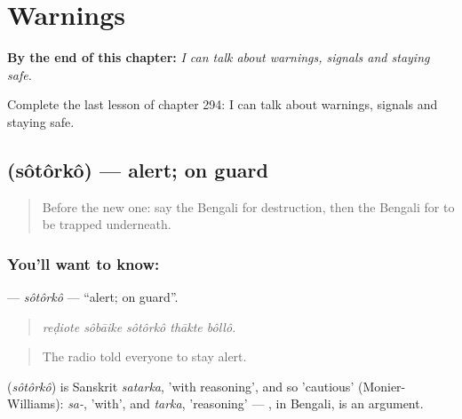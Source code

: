 
\chapter{Warnings}
\label{ch:bn-warnings}

\begin{chapteropening}
\textbf{By the end of this chapter:} \emph{I can talk about warnings, signals and staying safe.}

Complete the last lesson of chapter 294: I can talk about warnings, signals and staying safe.
\end{chapteropening}

\section[\texorpdfstring{\bn{সতর্ক} (sôtôrkô)}{সতর্ক (sôtôrkô)}]{ (sôtôrkô) — alert; on guard}

\label{lesson:BN-C294-sotorko}



\begin{quote}
Before the new one: say the Bengali for destruction, then the Bengali for to be trapped underneath.
\end{quote}

\subsection*{You'll want to know: }
\textbf{} — \emph{sôtôrkô} — \textquotedblleft{}alert; on guard\textquotedblright{}.

\begin{quote}
    
\end{quote}

\begin{quote}
\emph{reḍiote sôbāike sôtôrkô thākte bôllô.}
\end{quote}

\begin{quote}
The radio told everyone to stay alert.
\end{quote}

\begin{cousinweb}
\textbf{} (\emph{sôtôrkô}) is Sanskrit \emph{satarka}, 'with reasoning', and so 'cautious' (Monier-Williams): \emph{sa-}, 'with', and \emph{tarka}, 'reasoning' — \textbf{}, in Bengali, is an argument.
\end{cousinweb}

